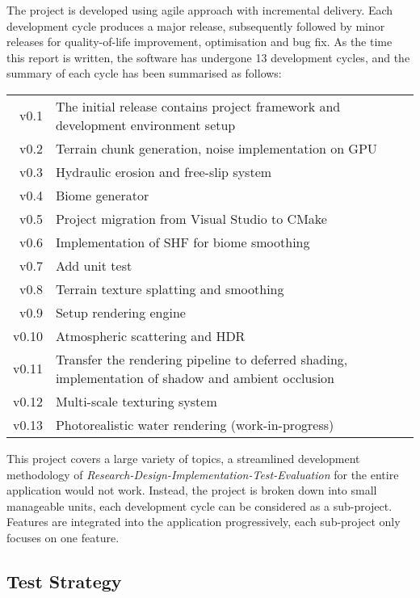 \documentclass[oneside, a4paper]{report}
\begin{document}
    The project is developed using agile approach with incremental delivery. Each development cycle produces a major release, subsequently followed by minor releases for quality-of-life improvement, optimisation and bug fix. As the time this report is written, the software has undergone 13 development cycles, and the summary of each cycle has been summarised as follows:

    \begin{center}
        \begin{tabular}{r|p{12cm}}
            v0.1 & The initial release contains project framework and development environment setup \\
            v0.2 & Terrain chunk generation, noise implementation on GPU \\
            v0.3 & Hydraulic erosion and free-slip system \\
            v0.4 & Biome generator \\
            v0.5 & Project migration from Visual Studio to CMake \\
            v0.6 & Implementation of SHF for biome smoothing \\
            v0.7 & Add unit test \\
            v0.8 & Terrain texture splatting and smoothing \\
            v0.9 & Setup rendering engine \\
            v0.10 & Atmospheric scattering and HDR \\
            v0.11 & Transfer the rendering pipeline to deferred shading, implementation of shadow and ambient occlusion \\
            v0.12 & Multi-scale texturing system \\
            v0.13 & Photorealistic water rendering (work-in-progress)
        \end{tabular}
    \end{center}

    This project covers a large variety of topics, a streamlined development methodology of \textit{Research-Design-Implementation-Test-Evaluation} for the entire application would not work. Instead, the project is broken down into small manageable units, each development cycle can be considered as a sub-project. Features are integrated into the application progressively, each sub-project only focuses on one feature.

    \subsection{Test Strategy}
\end{document}
